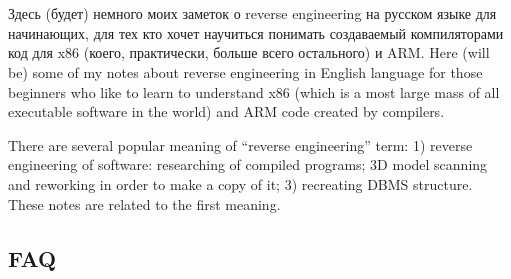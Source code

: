 ﻿\chapter{}

\IFRU
{Здесь (будет) немного моих заметок о reverse engineering на русском языке для начинающих, 
для тех кто хочет научиться понимать создаваемый \CCpp компиляторами код для x86 (коего, 
практически, больше всего остального) и ARM.}
{Here (will be) some of my notes about reverse engineering in English language for 
those beginners who like to learn to understand x86 (which is a most large mass of 
all executable software in the world) and ARM code created by \CCpp compilers.}

{There are several popular meaning of ``reverse engineering'' term: 
1) reverse engineering of software: researching of compiled programs;
3D model scanning and reworking in order to make a copy of it;
3) recreating \ac{DBMS} structure.
These notes are related to the first meaning.}

\section{\ac{FAQ}}

\newcommand{\FNURLREDDIT}{\footnote{\url{http://www.reddit.com/r/ReverseEngineering/}}}

